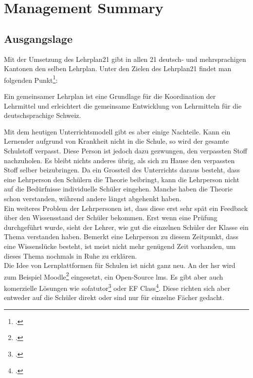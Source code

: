 \section{Management Summary}

\subsection{Ausgangslage}
Mit der Umsetzung des Lehrplan21 gibt in allen 21 deutsch- und mehrsprachigen Kantonen den selben Lehrplan. Unter den Zielen des Lehrplan21 findet man folgenden Punkt\footcite{lp21_ziel}:

\begin{displayquote}
Ein gemeinsamer Lehrplan ist eine Grundlage für die Koordination der Lehrmittel und erleichtert die gemeinsame Entwicklung von Lehrmitteln für die deutschsprachige Schweiz.
\end{displayquote}

Mit dem heutigen Unterrichtsmodell gibt es aber einige Nachteile. Kann ein Lernender aufgrund von Krankheit nicht in die Schule, so wird der gesamte Schulstoff verpasst. Diese Person ist jedoch dazu gezwungen, den verpassten Stoff nachzuholen. Es bleibt nichts anderes übrig, als sich zu Hause den verpassten Stoff selber beizubringen. Da ein Grossteil des Unterrichts daraus besteht, dass eine Lehrperson den Schülern die Theorie beibringt, kann die Lehrperson nicht auf die Bedürfnisse individuelle Schüler eingehen. Manche haben die Theorie schon verstanden, während andere längst abgehenkt haben. \\

Ein weiteres Problem der Lehrpersonen ist, dass diese erst sehr spät ein Feedback über den Wissensstand der Schüler bekommen. Erst wenn eine Prüfung durchgeführt wurde, sieht der Lehrer, wie gut die einzelnen Schüler der Klasse ein Thema verstanden haben. Bemerkt eine Lehrperson zu diesem Zeitpunkt, dass eine Wissenslücke besteht, ist meist nicht mehr genügend Zeit vorhanden, um dieses Thema nochmals in Ruhe zu erklären. \\


Die Idee von Lernplattformen für Schulen ist nicht ganz neu. An der \gls{hsr} wird zum Beispiel Moodle\footcite{moodle_homepage} eingesetzt, ein Open-Source \gls{lms}. Es gibt aber auch komerzielle Lösungen wie sofatutor\footcite{sofatutor_homepage} oder EF Class\footcite{ef_class_homepage}. Diese richten sich aber entweder auf die Schüler direkt oder sind nur für einzelne Fächer gedacht. \\

